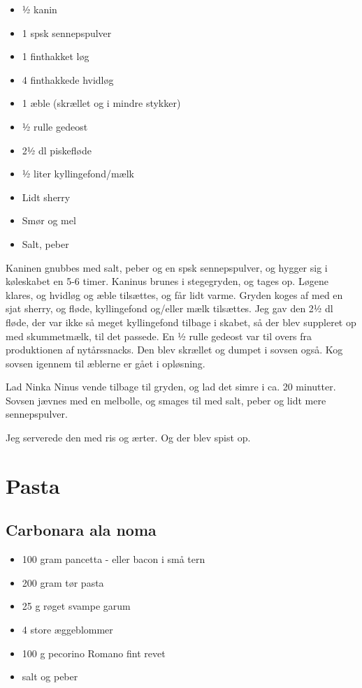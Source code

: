 \documentclass[
]{book}
\providecommand{\tightlist}{%
  \setlength{\itemsep}{0pt}\setlength{\parskip}{0pt}}
\begin{document}
\begin{itemize}
\tightlist
\item
  ½ kanin
\item
  1 spsk sennepspulver
\item
  1 finthakket løg
\item
  4 finthakkede hvidløg
\item
  1 æble (skrællet og i mindre stykker)
\item
  ½ rulle gedeost
\item
  2½ dl piskefløde
\item
  ½ liter kyllingefond/mælk
\item
  Lidt sherry
\item
  Smør og mel
\item
  Salt, peber
\end{itemize}

Kaninen gnubbes med salt, peber og en spsk sennepspulver, og hygger sig i køleskabet en 5-6 timer.
Kaninus brunes i stegegryden, og tages op.
Løgene klares, og hvidløg og æble tilsættes, og får lidt varme.
Gryden koges af med en sjat sherry, og fløde, kyllingefond og/eller mælk tilsættes.
Jeg gav den 2½ dl fløde, der var ikke så meget kyllingefond tilbage i skabet, så der blev suppleret op med skummetmælk, til det passede.
En ½ rulle gedeost var til overs fra produktionen af nytårssnacks. Den blev skrællet og dumpet i sovsen også. Kog sovsen igennem til æblerne er gået i opløsning.

Lad Ninka Ninus vende tilbage til gryden, og lad det simre i ca. 20 minutter.
Sovsen jævnes med en melbolle, og smages til med salt, peber og lidt mere sennepspulver.

Jeg serverede den med ris og ærter. Og der blev spist op.

\chapter{Pasta}\label{pasta}

\section{Carbonara ala noma}\label{carbonara-ala-noma}

\begin{itemize}
\tightlist
\item
  100 gram pancetta - eller bacon i små tern
\item
  200 gram tør pasta
\item
  25 g røget svampe garum
\item
  4 store æggeblommer
\item
  100 g pecorino Romano fint revet
\item
  salt og peber
\end{itemize}
\end{document}
